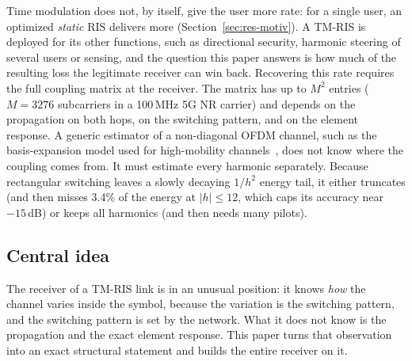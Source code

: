 Time modulation does not, by itself, give the user more rate: for a single user, an optimized \emph{static} RIS
delivers more (Section~\ref{sec:res-motiv}). A TM-RIS is deployed for its other functions, such as directional
security, harmonic steering of several users or sensing, and the question this paper answers is how much of the
resulting loss the legitimate receiver can win back. Recovering this rate requires the full coupling matrix at the receiver. The matrix
has up to $M^2$ entries ($M=3276$ subcarriers in a 100\,MHz 5G NR carrier) and
depends on the propagation on both hops, on the switching pattern, and on the
element response. A generic estimator of a non-diagonal OFDM channel, such as the
basis-expansion model used for high-mobility channels~\cite{tang2007}, does not
know where the coupling comes from. It must estimate every harmonic separately.
Because rectangular switching leaves a slowly decaying $1/h^2$ energy tail, it
either truncates (and then misses 3.4\% of the energy at $|h|\le 12$, which caps its
accuracy near $-15$\,dB) or keeps all harmonics (and then needs many pilots).

\subsection{Central idea}
The receiver of a TM-RIS link is in an unusual position: it knows \emph{how} the
channel varies inside the symbol, because the variation is the switching pattern,
and the switching pattern is set by the network. What it does not know is the
propagation and the exact element response. This paper turns that observation
into an exact structural statement and builds the entire receiver on it.

